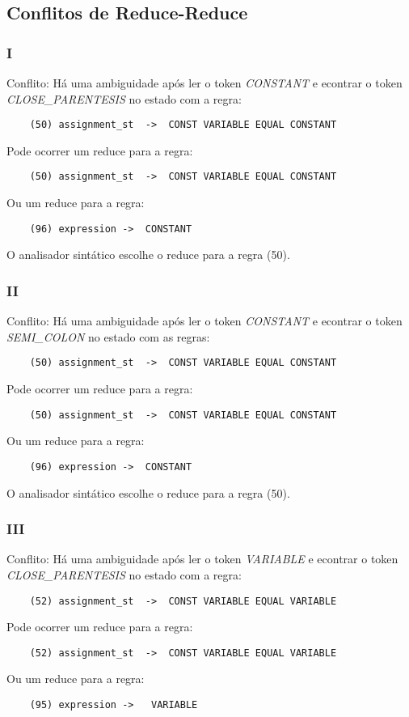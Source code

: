 \documentclass[a4paper,10pt]{article}
\begin{document}
  \subsection{Conflitos de Reduce-Reduce}
    \subsubsection{I}
    Conflito: H\'a uma ambiguidade ap\'os ler o token \emph{CONSTANT} e econtrar o token \emph{CLOSE\_PARENTESIS} no estado com a regra:
    \begin{lstlisting}
    (50) assignment_st	->	CONST VARIABLE EQUAL CONSTANT
    \end{lstlisting}
    Pode ocorrer um reduce para a regra:
    \begin{lstlisting}
    (50) assignment_st	->	CONST VARIABLE EQUAL CONSTANT
    \end{lstlisting}
    Ou um reduce para a regra:
    \begin{lstlisting}
    (96) expression	->	CONSTANT
    \end{lstlisting}
    O analisador sint\'atico escolhe o reduce para a regra (50).
    \vspace{5mm}

    \subsubsection{II}
    Conflito: H\'a uma ambiguidade ap\'os ler o token \emph{CONSTANT} e econtrar o token \emph{SEMI\_COLON} no estado com as regras:
    \begin{lstlisting}
    (50) assignment_st	->	CONST VARIABLE EQUAL CONSTANT
    \end{lstlisting}
    Pode ocorrer um reduce para a regra:
    \begin{lstlisting}
    (50) assignment_st	->	CONST VARIABLE EQUAL CONSTANT
    \end{lstlisting}
    Ou um reduce para a regra:
    \begin{lstlisting}
    (96) expression	->	CONSTANT
    \end{lstlisting}
    O analisador sint\'atico escolhe o reduce para a regra (50).
    \vspace{5mm}

    \subsubsection{III}
    Conflito: H\'a uma ambiguidade ap\'os ler o token \emph{VARIABLE} e econtrar o token \emph{CLOSE\_PARENTESIS} no estado com a regra:
    \begin{lstlisting}
    (52) assignment_st	->	CONST VARIABLE EQUAL VARIABLE
    \end{lstlisting}
    Pode ocorrer um reduce para a regra:
    \begin{lstlisting}
    (52) assignment_st	->	CONST VARIABLE EQUAL VARIABLE
    \end{lstlisting}
    Ou um reduce para a regra:
    \begin{lstlisting}
    (95) expression	->	 VARIABLE
    \end{lstlisting}
    \vspace{5mm}
\end{document}
